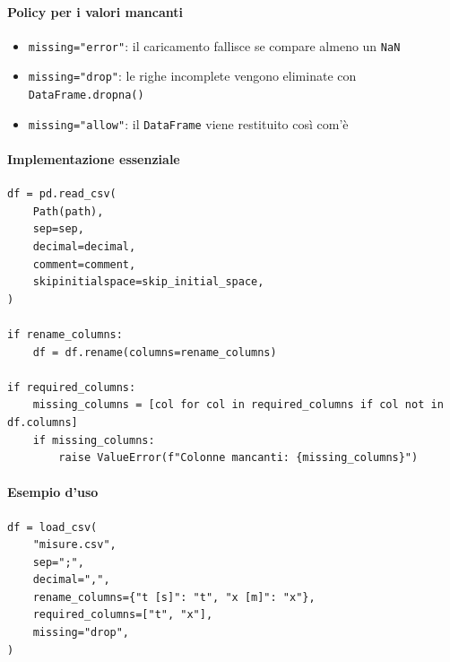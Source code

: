 \paragraph{Policy per i valori mancanti}
\begin{itemize}
  \item \texttt{missing="error"}: il caricamento fallisce se compare almeno un \texttt{NaN}
  \item \texttt{missing="drop"}: le righe incomplete vengono eliminate con \texttt{DataFrame.dropna()}
  \item \texttt{missing="allow"}: il \texttt{DataFrame} viene restituito così com'è
\end{itemize}

\paragraph{Implementazione essenziale}
\begin{verbatim}
df = pd.read_csv(
    Path(path),
    sep=sep,
    decimal=decimal,
    comment=comment,
    skipinitialspace=skip_initial_space,
)

if rename_columns:
    df = df.rename(columns=rename_columns)

if required_columns:
    missing_columns = [col for col in required_columns if col not in df.columns]
    if missing_columns:
        raise ValueError(f"Colonne mancanti: {missing_columns}")
\end{verbatim}

\paragraph{Esempio d'uso}
\begin{verbatim}
df = load_csv(
    "misure.csv",
    sep=";",
    decimal=",",
    rename_columns={"t [s]": "t", "x [m]": "x"},
    required_columns=["t", "x"],
    missing="drop",
)
\end{verbatim}
